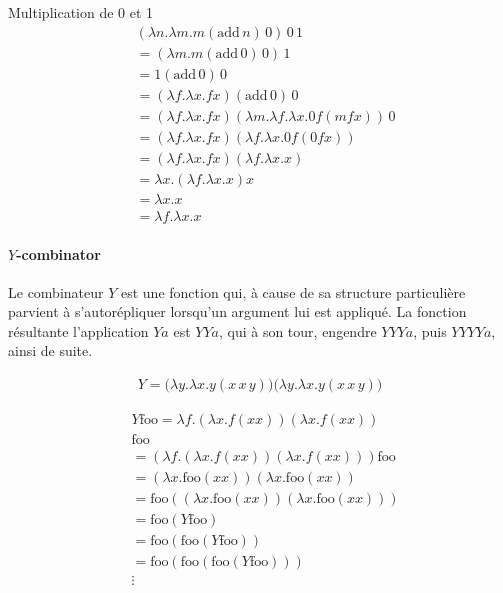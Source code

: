 \documentclass{report}
\begin{document}
\begin{multicols*}{3}
  \begin{EExample}{Multiplication de 0 et 1}{}
     \begin{align*}
      &(\lambda n . \lambda m . m (\text{add} \, n) \, 0) \, 0 \, 1 \\
      &= (\lambda m . m (\text{add} \, 0) \, 0) \, 1 \\
      &= 1 (\text{add} \, 0) \, 0 \\
      &= (\lambda f . \lambda x . f x) (\text{add} \, 0) \, 0 \\
      &= (\lambda f . \lambda x . f x) (\lambda m . \lambda f . \lambda x . 0 f (m f x)) \, 0 \\
      &= (\lambda f . \lambda x . f x) (\lambda f . \lambda x . 0 f (0 f x)) \\
      &= (\lambda f . \lambda x . f x) (\lambda f . \lambda x . x) \\
      &= \lambda x . (\lambda f . \lambda x . x) x \\
      &= \lambda x . x \\
      &= \lambda f . \lambda x . x
    \end{align*}
  \end{EExample}

  \paragraph{$Y$-combinator}
  Le combinateur $Y$ est une fonction qui, à cause de sa structure particulière 
  parvient à s'autorépliquer lorsqu'un argument lui est appliqué. La fonction 
  résultante l'application $Y a$ est $Y Y a$, qui à son tour, engendre 
  $Y Y Y a$, puis $Y Y Y Y a$, ainsi de suite. 

  \begin{align*}
    Y = \bigl(\lambda y . \lambda x . y (x \, x \, y)\bigr)
        \bigl(\lambda y . \lambda x . y (x \, x \, y)\bigr)
  \end{align*}

  \begin{EExample}{}{}
   \begin{align*}
    &Y 
    \text{foo} = \lambda f . (\lambda x . f (x x)) (\lambda x . f (x x)) \\
    &\text{foo} \\
    &= (\lambda f . (\lambda x . f (x x)) (\lambda x . f (x x))) \text{foo} \\
    &= (\lambda x . \text{foo} (x x)) (\lambda x . \text{foo} (x x)) \\
    &= \text{foo} ((\lambda x . \text{foo} (x x)) (\lambda x . \text{foo} (x x))) \\
    &= \text{foo} (Y \text{foo}) \\
    &= \text{foo} (\text{foo} (Y \text{foo})) \\
    &= \text{foo} (\text{foo} (\text{foo} (Y \text{foo}))) \\
    &\vdots
  \end{align*}     
  \end{EExample}





\end{multicols*}
\end{document}
